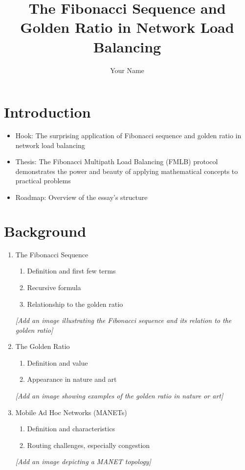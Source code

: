 \documentclass{article}
\begin{document}
\title{The Fibonacci Sequence and Golden Ratio in Network Load Balancing}
\author{Your Name}
\date{}
\maketitle

\section{Introduction}
\begin{itemize}
    \item Hook: The surprising application of Fibonacci sequence and golden ratio in network load balancing
    \item Thesis: The Fibonacci Multipath Load Balancing (FMLB) protocol demonstrates the power and beauty of applying mathematical concepts to practical problems
    \item Roadmap: Overview of the essay's structure
\end{itemize}

\section{Background}
\begin{enumerate}
    \item The Fibonacci Sequence
    \begin{enumerate}
        \item Definition and first few terms
        \item Recursive formula
        \item Relationship to the golden ratio
    \end{enumerate}
    \textit{[Add an image illustrating the Fibonacci sequence and its relation to the golden ratio]}
    \item The Golden Ratio
    \begin{enumerate}
        \item Definition and value
        \item Appearance in nature and art
    \end{enumerate}
    \textit{[Add an image showing examples of the golden ratio in nature or art]}
    \item Mobile Ad Hoc Networks (MANETs)
    \begin{enumerate}
        \item Definition and characteristics
        \item Routing challenges, especially congestion
    \end{enumerate}
    \textit{[Add an image depicting a MANET topology]}
\end{enumerate}
\end{document}
